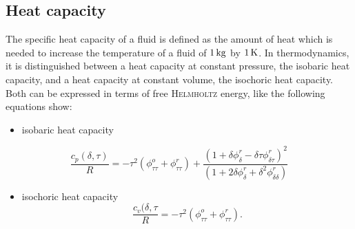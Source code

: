 \subsection{Heat capacity}

The specific heat capacity of a fluid is defined as the amount of heat which is needed to increase the temperature of a fluid of $\unit[1]{kg}$ by $\unit[1]{K}$. In thermodynamics, it is distinguished between a heat capacity at constant pressure, the isobaric heat capacity, and a heat capacity at constant volume, the isochoric heat capacity. Both can be expressed in terms of free \textsc{Helmholtz} energy, like the following equations show:

\begin{itemize}
\item[]isobaric heat capacity
\end{itemize}
\begin{equation}
\frac{c_p(\delta,\tau)}{R}=-\tau^2\left(\phi^o_{\tau\tau}+\phi^r_{\tau\tau}\right)+\frac{\left(1+\delta\phi^r_\delta-\delta\tau\phi^r_{\delta\tau}\right)^2}{\left(1+2\delta\phi^r_\delta+\delta^2\phi^r_{\delta\delta}\right)} 
\label{eq-fhe-isobar}
\end{equation}

\begin{itemize}
\item[]isochoric heat capacity
\begin{equation}
\frac{c_v(\delta,\tau}{R}=-\tau^2\left(\phi^o_{\tau\tau}+\phi^r_{\tau\tau}\right).
\label{eq-fhe-isochor}
\end{equation}
\end{itemize}





